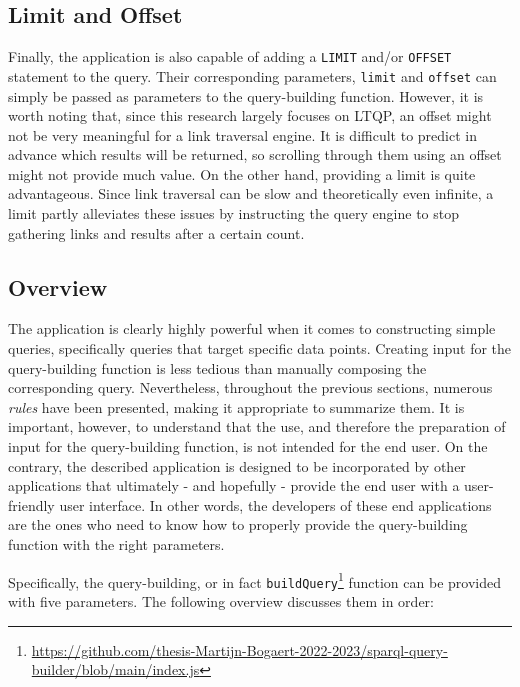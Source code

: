 \subsection{Limit and Offset}
\label{subsec:limit_offset}

Finally, the application is also capable of adding a \texttt{LIMIT} and/or \texttt{OFFSET} statement to the query. Their corresponding parameters, \texttt{limit} and \texttt{offset} can simply be passed as parameters to the query-building function. However, it is worth noting that, since this research largely focuses on LTQP, an offset might not be very meaningful for a link traversal engine. It is difficult to predict in advance which results will be returned, so scrolling through them using an offset might not provide much value. On the other hand, providing a limit is quite advantageous. Since link traversal can be slow and theoretically even infinite, a limit partly alleviates these issues by instructing the query engine to stop gathering links and results after a certain count.

\subsection{Overview}
\label{subsec:building_queries_predicate_sequences_overview}

The application is clearly highly powerful when it comes to constructing simple queries, specifically queries that target specific data points. Creating input for the query-building function is less tedious than manually composing the corresponding query. Nevertheless, throughout the previous sections, numerous \textit{rules} have been presented, making it appropriate to summarize them. It is important, however, to understand that the use, and therefore the preparation of input for the query-building function, is not intended for the end user. On the contrary, the described application is designed to be incorporated by other applications that ultimately - and hopefully - provide the end user with a user-friendly user interface. In other words, the developers of these end applications are the ones who need to know how to properly provide the query-building function with the right parameters.

Specifically, the query-building, or in fact \texttt{buildQuery}\footnote{\url{https://github.com/thesis-Martijn-Bogaert-2022-2023/sparql-query-builder/blob/main/index.js}} function can be provided with five parameters. The following overview discusses them in order:

